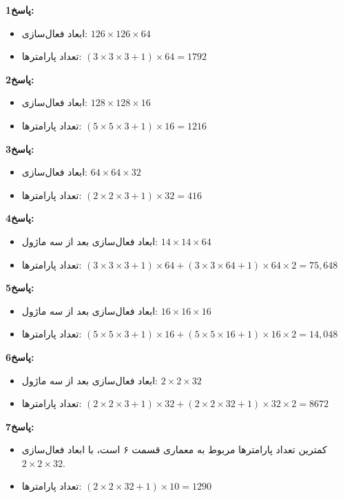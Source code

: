     \textbf{پاسخ1:} 
    \begin{itemize}
        \item ابعاد فعال‌سازی: $126 \times 126 \times 64$
        \item تعداد پارامترها: $(3 \times 3 \times 3 + 1) \times 64 = 1792$
    \end{itemize}


        \textbf{پاسخ2:} 
    \begin{itemize}
        \item ابعاد فعال‌سازی: $128 \times 128 \times 16$
        \item تعداد پارامترها: $(5 \times 5 \times 3 + 1) \times 16 = 1216$
    \end{itemize}

        \textbf{پاسخ3:} 
    \begin{itemize}
        \item ابعاد فعال‌سازی: $64 \times 64 \times 32$
        \item تعداد پارامترها: $(2 \times 2 \times 3 + 1) \times 32 = 416$
    \end{itemize}


        \textbf{پاسخ4:} 
    \begin{itemize}
        \item ابعاد فعال‌سازی بعد از سه ماژول: $14 \times 14 \times 64$
        \item تعداد پارامترها: $(3 \times 3 \times 3 + 1) \times 64 + (3 \times 3 \times 64 + 1) \times 64 \times 2 = 75,648$
    \end{itemize}

    \textbf{پاسخ5:} 
    \begin{itemize}
        \item ابعاد فعال‌سازی بعد از سه ماژول: $16 \times 16 \times 16$
        \item تعداد پارامترها: $(5 \times 5 \times 3 + 1) \times 16 + (5 \times 5 \times 16 + 1) \times 16 \times 2 = 14,048$
    \end{itemize}



    
    \textbf{پاسخ6:} 
    \begin{itemize}
        \item ابعاد فعال‌سازی بعد از سه ماژول: $2 \times 2 \times 32$
        \item تعداد پارامترها: $(2 \times 2 \times 3 + 1) \times 32 + (2 \times 2 \times 32 + 1) \times 32 \times 2 = 8672$
    \end{itemize}

        \textbf{پاسخ7:} 
    \begin{itemize}
        \item کمترین تعداد پارامترها مربوط به معماری قسمت ۶ است، با ابعاد فعال‌سازی $2 \times 2 \times 32$.
        \item تعداد پارامترها: $(2 \times 2 \times 32 + 1) \times 10 = 1290$
    \end{itemize}